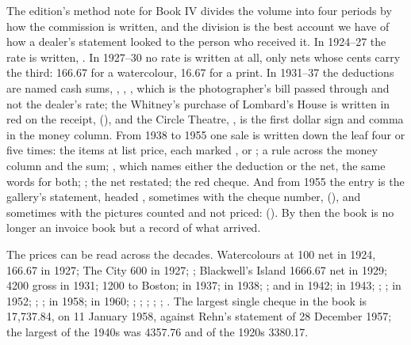 The edition's method note for Book IV divides the volume into four periods by how the commission is written, and the division is the best account we have of how a dealer's statement looked to the person who received it. In 1924--27 the rate is written, . In 1927--30 no rate is written at all, only nets whose cents carry the third: 166.67 for a watercolour, 16.67 for a print. In 1931--37 the deductions are named cash sums, , , , which is the photographer's bill passed through and not the dealer's rate; the Whitney's purchase of Lombard's House is written in red on the receipt,  (), and the Circle Theatre, , is the first dollar sign and comma in the money column. From 1938 to 1955 one sale is written down the leaf four or five times: the items at list price, each marked ,  or ; a rule across the money column and the sum; , which names either the deduction or the net, the same words for both; ; the net restated; the red cheque. And from 1955 the entry is the gallery's statement, headed , sometimes with the cheque number,  (), and sometimes with the pictures counted and not priced:  (). By then the book is no longer an invoice book but a record of what arrived.

The prices can be read across the decades. Watercolours at 100 net in 1924, 166.67 in 1927; The City 600 in 1927; ; Blackwell's Island 1666.67 net in 1929;  4200 gross in 1931;  1200 to Boston;  in 1937;  in 1938; ;  and  in 1942;  in 1943; ; ;  in 1952; ; ;  in 1958;  in 1960; ; ; ; ; ; . The largest single cheque in the book is 17,737.84, on 11 January 1958, against Rehn's statement of 28 December 1957; the largest of the 1940s was 4357.76 and of the 1920s 3380.17.

